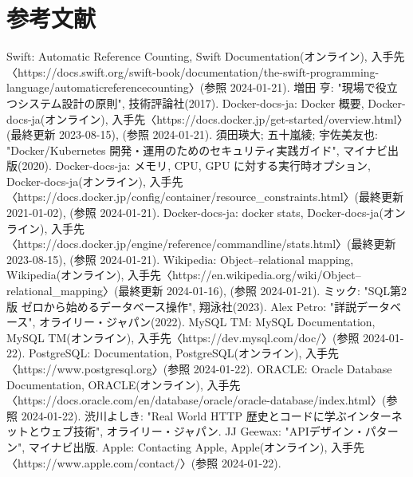 \documentclass[../../main]{subfiles}
\begin{document}
    \section{参考文献}\label{sec:reference}

    \begin{thebibliography}{99}
         Swift: Automatic Reference Counting, Swift Documentation(オンライン), 入手先〈https://docs.swift.org/swift-book/documentation/the-swift-programming-language/automaticreferencecounting〉(参照 2024-01-21).
         増田 亨: "現場で役立つシステム設計の原則", 技術評論社(2017).
         Docker-docs-ja: Docker 概要, Docker-docs-ja(オンライン), 入手先〈https://docs.docker.jp/get-started/overview.html〉(最終更新 2023-08-15), (参照 2024-01-21).
         須田瑛大; 五十嵐綾; 宇佐美友也: "Docker/Kubernetes 開発・運用のためのセキュリティ実践ガイド", マイナビ出版(2020).
         Docker-docs-ja: メモリ, CPU, GPU に対する実行時オプション, Docker-docs-ja(オンライン), 入手先〈https://docs.docker.jp/config/container/resource\_constraints.html〉(最終更新 2021-01-02), (参照 2024-01-21).
         Docker-docs-ja: docker stats, Docker-docs-ja(オンライン), 入手先〈https://docs.docker.jp/engine/reference/commandline/stats.html〉(最終更新 2023-08-15), (参照 2024-01-21).
         Wikipedia: Object–relational mapping, Wikipedia(オンライン), 入手先〈https://en.wikipedia.org/wiki/Object–relational\_mapping〉(最終更新 2024-01-16), (参照 2024-01-21).
         ミック: "SQL第2版 ゼロから始めるデータベース操作", 翔泳社(2023).
         Alex Petro: "詳説データベース", オライリー・ジャパン(2022).
         MySQL TM: MySQL Documentation, MySQL TM(オンライン), 入手先〈https://dev.mysql.com/doc/〉(参照 2024-01-22).
         PostgreSQL: Documentation, PostgreSQL(オンライン), 入手先〈https://www.postgresql.org〉(参照 2024-01-22).
         ORACLE: Oracle Database Documentation, ORACLE(オンライン), 入手先〈https://docs.oracle.com/en/database/oracle/oracle-database/index.html〉(参照 2024-01-22).
         渋川よしき: "Real World HTTP 歴史とコードに学ぶインターネットとウェブ技術", オライリー・ジャパン.
         JJ Geewax: "APIデザイン・パターン", マイナビ出版.
         Apple: Contacting Apple, Apple(オンライン), 入手先〈https://www.apple.com/contact/〉(参照 2024-01-22).

\end{thebibliography}
\end{document}
